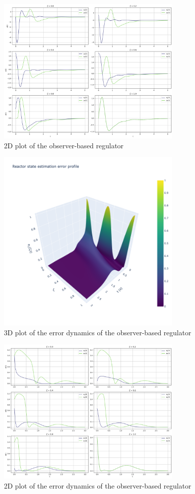 \begin{figure}[!htbp]
    \centering
    \includegraphics[width=0.8\textwidth]{Figures/2D_xt_L_k7.png}
    \caption{2D plot of the observer-based regulator}
    \label{fig:2D_xt_L_k7}
\end{figure}

\begin{figure}[!htbp]
    \centering
    \includegraphics[width=0.8\textwidth]{Figures/3D_e1_L_k7.png}
    \caption{3D plot of the error dynamics of the observer-based regulator}
    \label{fig:3D_e1_L_k7}
\end{figure}

\begin{figure}[!htbp]
    \centering
    \includegraphics[width=0.8\textwidth]{Figures/2D_et_L_k7.png}
    \caption{2D plot of the error dynamics of the observer-based regulator}
    \label{fig:2D_et_L_k7}
\end{figure}
